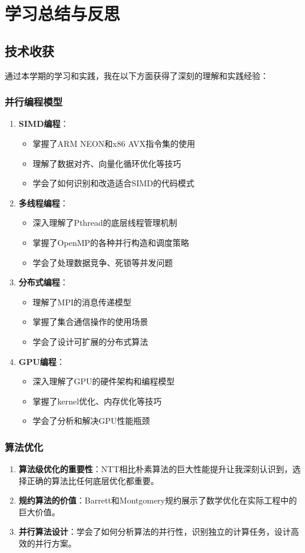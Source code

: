 \documentclass[a4paper]{article}
\begin{document}
	\section{学习总结与反思}
	\subsection{技术收获}
	通过本学期的学习和实践，我在以下方面获得了深刻的理解和实践经验：
	\subsubsection{并行编程模型}
	\begin{enumerate}
		\item \textbf{SIMD编程}：
		\begin{itemize}
			\item 掌握了ARM NEON和x86 AVX指令集的使用
			\item 理解了数据对齐、向量化循环优化等技巧
			\item 学会了如何识别和改造适合SIMD的代码模式
		\end{itemize}
		\item \textbf{多线程编程}：
		\begin{itemize}
			\item 深入理解了Pthread的底层线程管理机制
			\item 掌握了OpenMP的各种并行构造和调度策略
			\item 学会了处理数据竞争、死锁等并发问题
		\end{itemize}
		
		\item \textbf{分布式编程}：
		\begin{itemize}
			\item 理解了MPI的消息传递模型
			\item 掌握了集合通信操作的使用场景
			\item 学会了设计可扩展的分布式算法
		\end{itemize}
		
		\item \textbf{GPU编程}：
		\begin{itemize}
			\item 深入理解了GPU的硬件架构和编程模型
			\item 掌握了kernel优化、内存优化等技巧
			\item 学会了分析和解决GPU性能瓶颈
		\end{itemize}
	\end{enumerate}
	\subsubsection{算法优化}
	\begin{enumerate}
		\item \textbf{算法级优化的重要性}：NTT相比朴素算法的巨大性能提升让我深刻认识到，选择正确的算法比任何底层优化都重要。
		\item \textbf{规约算法的价值}：Barrett和Montgomery规约展示了数学优化在实际工程中的巨大价值。
		
		\item \textbf{并行算法设计}：学会了如何分析算法的并行性，识别独立的计算任务，设计高效的并行方案。
	\end{enumerate}
\end{document}
